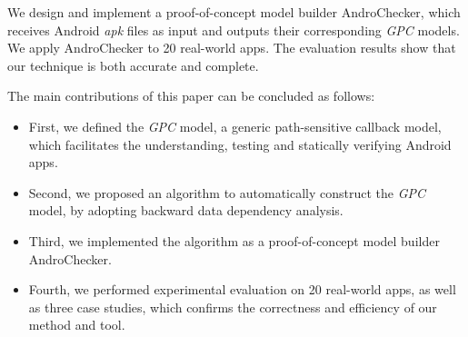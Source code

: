 We design and implement a proof-of-concept model builder AndroChecker, which receives Android \textit{apk} files as input and outputs their corresponding \textit{GPC} models. We apply AndroChecker to 20 real-world apps. The evaluation results show that our technique is both accurate and complete. 

The main contributions of this paper can be concluded as follows: 
\begin{itemize}
\item First, we defined the \textit{GPC} model, a generic path-sensitive callback model, which facilitates the understanding, testing and statically verifying Android apps.
\item Second, we proposed an algorithm to automatically construct the \textit{GPC} model, by adopting backward data dependency analysis.
\item Third, we implemented the algorithm as a proof-of-concept model builder AndroChecker.
\item Fourth, we performed experimental evaluation on 20 real-world apps, as well as three case studies, which confirms the correctness and efficiency of our method and tool.
\end{itemize}

%
%
